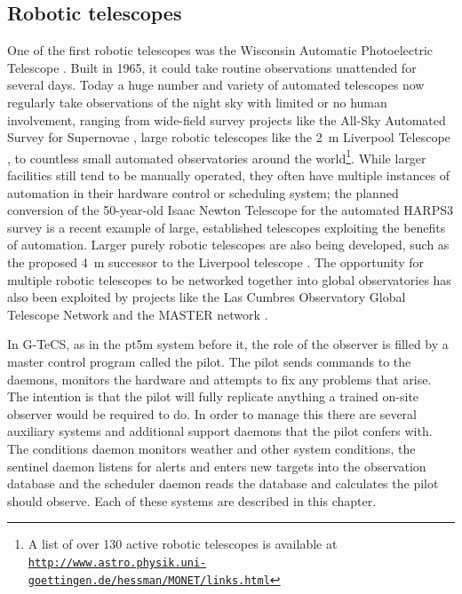 \subsection{Robotic telescopes}
\label{sec:robotic_telescopes}
\begin{colsection}

One of the first robotic telescopes was the Wisconsin Automatic Photoelectric Telescope \citep{Wisconsin_APT}. Built in 1965, it could take routine observations unattended for several days. Today a huge number and variety of automated telescopes now regularly take observations of the night sky with limited or no human involvement, ranging from wide-field survey projects like the All-Sky Automated Survey for Supernovae  \citep[ASAS-SN,][]{ASAS-SN}, large robotic telescopes like the \SI{2}{\metre} Liverpool Telescope \citep{Liverpool}, to countless small automated observatories around the world\footnote{A list of over 130 active robotic telescopes is available at \href{http://www.astro.physik.uni-goettingen.de/~hessman/MONET/links.html}{\texttt{http://www.astro.physik.uni-}} \\ \href{http://www.astro.physik.uni-goettingen.de/~hessman/MONET/links.html}{\texttt{goettingen.de/\raisebox{0.5ex}{\texttildelow}hessman/MONET/links.html}}}. While larger facilities still tend to be manually operated, they often have multiple instances of automation in their hardware control or scheduling system; the planned conversion of the 50-year-old Isaac Newton Telescope for the automated HARPS3 survey \citep{INT_robotic} is a recent example of large, established telescopes exploiting the benefits of automation. Larger purely robotic telescopes are also being developed, such as the proposed \SI{4}{\metre} successor to the Liverpool telescope \citep{Liverpool2}. The opportunity for multiple robotic telescopes to be networked together into global observatories has also been exploited by projects like the Las Cumbres Observatory Global Telescope Network \citep{LCO} and the MASTER network \citep{MASTER}.

In G-TeCS, as in the pt5m system before it, the role of the observer is filled by a master control program called the pilot. The pilot sends commands to the daemons, monitors the hardware and attempts to fix any problems that arise. The intention is that the pilot will fully replicate anything a trained on-site observer would be required to do. In order to manage this there are several auxiliary systems and additional support daemons that the pilot confers with. The conditions daemon monitors weather and other system conditions, the sentinel daemon listens for alerts and enters new targets into the observation database and the scheduler daemon reads the database and calculates the pilot should observe. Each of these systems are described in this chapter.

\end{colsection}

